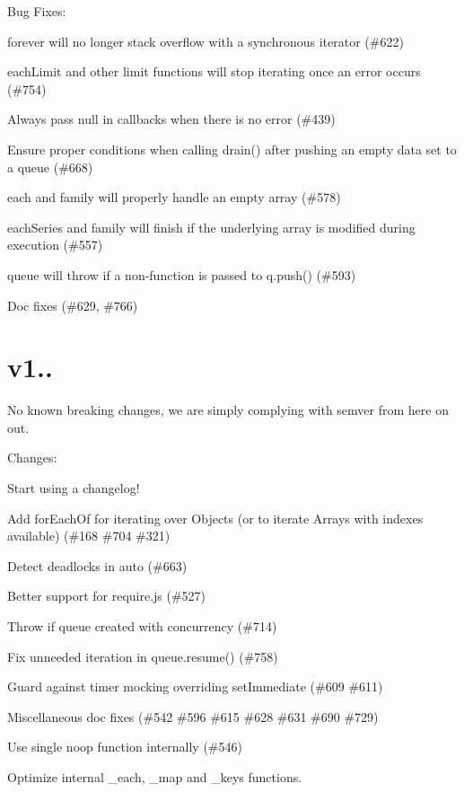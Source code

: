 Bug Fixes\+:


\begin{DoxyItemize}
\item {\ttfamily forever} will no longer stack overflow with a synchronous iterator (\#622)
\item {\ttfamily each\+Limit} and other limit functions will stop iterating once an error occurs (\#754)
\item Always pass {\ttfamily null} in callbacks when there is no error (\#439)
\item Ensure proper conditions when calling {\ttfamily drain()} after pushing an empty data set to a queue (\#668)
\item {\ttfamily each} and family will properly handle an empty array (\#578)
\item {\ttfamily each\+Series} and family will finish if the underlying array is modified during execution (\#557)
\item {\ttfamily queue} will throw if a non-\/function is passed to {\ttfamily q.\+push()} (\#593)
\item Doc fixes (\#629, \#766)
\end{DoxyItemize}

\section*{v1..}

No known breaking changes, we are simply complying with semver from here on out.

Changes\+:


\begin{DoxyItemize}
\item Start using a changelog!
\item Add {\ttfamily for\+Each\+Of} for iterating over Objects (or to iterate Arrays with indexes available) (\#168 \#704 \#321)
\item Detect deadlocks in {\ttfamily auto} (\#663)
\item Better support for require.\+js (\#527)
\item Throw if queue created with concurrency {} (\#714)
\item Fix unneeded iteration in {\ttfamily queue.\+resume()} (\#758)
\item Guard against timer mocking overriding {\ttfamily set\+Immediate} (\#609 \#611)
\item Miscellaneous doc fixes (\#542 \#596 \#615 \#628 \#631 \#690 \#729)
\item Use single noop function internally (\#546)
\item Optimize internal {\ttfamily \+\_\+each}, {\ttfamily \+\_\+map} and {\ttfamily \+\_\+keys} functions. 
\end{DoxyItemize}